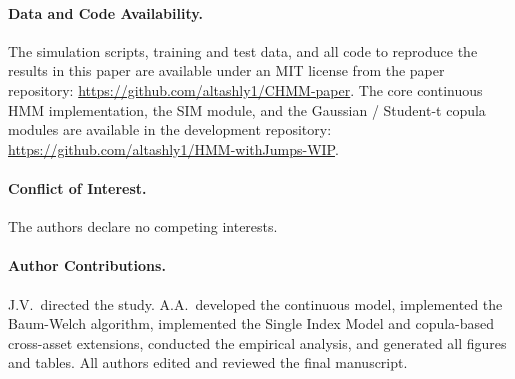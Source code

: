 \paragraph{Data and Code Availability.}
The simulation scripts, training and test data, and all code to reproduce the results in this paper are available under an MIT license from the paper repository: \url{https://github.com/altashly1/CHMM-paper}.
The core continuous HMM implementation, the SIM module, and the Gaussian / Student-t copula modules are available in the development repository: \url{https://github.com/altashly1/HMM-withJumps-WIP}.

\paragraph{Conflict of Interest.}
The authors declare no competing interests.

\paragraph{Author Contributions.}
J.V.\ directed the study.
A.A.\ developed the continuous model, implemented the Baum-Welch algorithm, implemented the Single Index Model and copula-based cross-asset extensions, conducted the empirical analysis, and generated all figures and tables.
All authors edited and reviewed the final manuscript.
